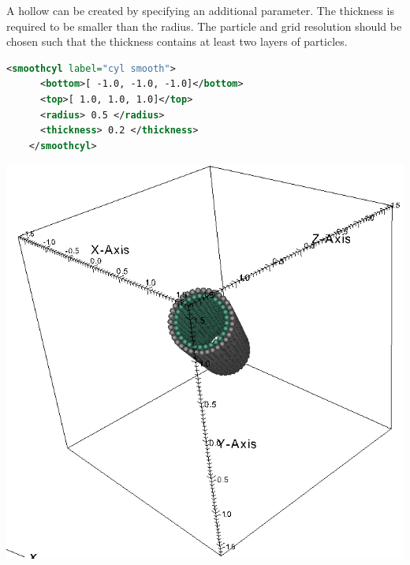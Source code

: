 \begin{minipage}{0.6\textwidth}
  A hollow  can be created by specifying an additional
   parameter.  The thickness is required to be smaller than
  the radius.  The particle and grid resolution should be chosen such that the thickness
  contains at least two layers of particles.
  \begin{lstlisting}[language=XML]
    <smoothcyl label="cyl smooth">
      <bottom>[ -1.0, -1.0, -1.0]</bottom>
      <top>[ 1.0, 1.0, 1.0]</top>
      <radius> 0.5 </radius>
      <thickness> 0.2 </thickness>
    </smoothcyl>
  \end{lstlisting}
\end{minipage}
\begin{minipage}{0.4\textwidth}
  \centering
  \includegraphics[width=0.9\columnwidth]{FIGS/geometry/geom_smooth_cyl_hollow.png}
\end{minipage}

